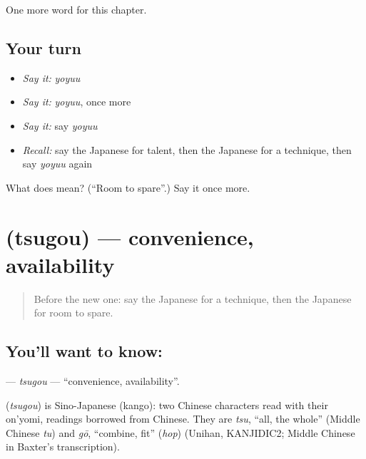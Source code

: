 \begin{grammarlens}[title={What you've built}]
One more word for this chapter.
\end{grammarlens}

\subsection*{Your turn}
\begin{itemize}
\raggedright
  \item \emph{Say it:} \emph{yoyuu}
  \item \emph{Say it:} \emph{yoyuu}, once more
  \item \emph{Say it:} say \emph{yoyuu}
  \item \emph{Recall:} say the Japanese for talent, then the Japanese for a technique, then say \emph{yoyuu} again
\end{itemize}

\begin{tcolorbox}[breakable,colback=teal!4,colframe=teal!35!black,title={Before you move on}]
What does  mean? (\textquotedblleft{}Room to spare\textquotedblright{}.) Say it once more.
\end{tcolorbox}
\section[\texorpdfstring{\ja{つごう} (tsugou)}{つごう (tsugou)}]{ (tsugou) — convenience, availability}

\label{lesson:JA-C96-tsugou}



\begin{quote}
Before the new one: say the Japanese for a technique, then the Japanese for room to spare.
\end{quote}

\subsection*{You'll want to know: }
\textbf{} — \emph{tsugou} — \textquotedblleft{}convenience, availability\textquotedblright{}.

\begin{cousinweb}
\textbf{} (\emph{tsugou}) is Sino-Japanese (kango): two Chinese characters read with their on'yomi, readings borrowed from Chinese. They are \emph{tsu}, \textquotedblleft{}all, the whole\textquotedblright{} (Middle Chinese \emph{tu}) and \emph{gō}, \textquotedblleft{}combine, fit\textquotedblright{} (\emph{hop}) (Unihan, KANJIDIC2; Middle Chinese in Baxter's transcription).
\end{cousinweb}

